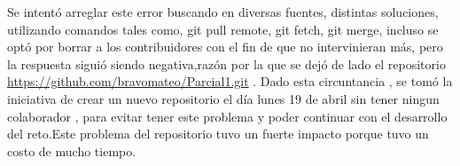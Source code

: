 \documentclass{article}
\begin{document}
Se intentó arreglar este error buscando en diversas fuentes, distintas soluciones, utilizando comandos tales como, git pull remote, git fetch, git merge, incluso se optó por borrar a los contribuidores con el fin de que no intervinieran más, pero la respuesta siguió siendo negativa,razón por la que se dejó de lado el repositorio\\ \url{https://github.com/bravomateo/Parcial1.git} . Dado esta circuntancia , se tomó la iniciativa de crear un nuevo repositorio el día lunes 19 de abril sin tener ningun colaborador , para evitar tener este problema y poder continuar con el desarrollo del reto.Este problema del repositorio tuvo un fuerte impacto porque tuvo un costo de mucho tiempo.\\






\end{document}
